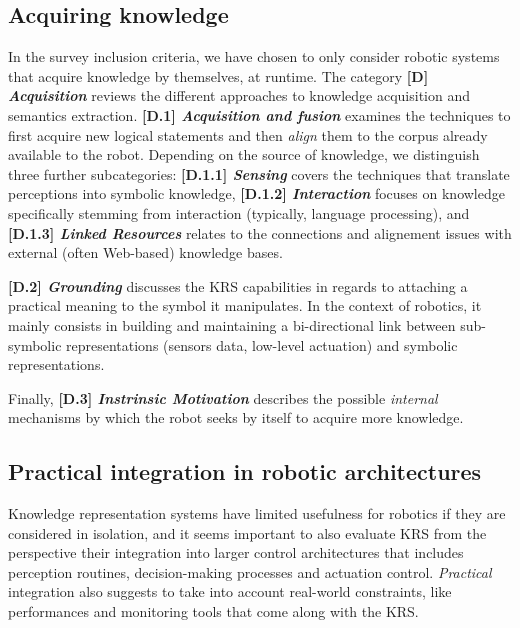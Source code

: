 \documentclass{IEEEtran}
\newcommand{\taxon}[2]{%
    \textbf{[#1] \emph{#2}}
}
\begin{document}
\subsection{Acquiring knowledge}

In the survey inclusion criteria, we have chosen to only consider robotic
systems that acquire knowledge by themselves, at runtime. The category
\taxon{D}{Acquisition} reviews the different approaches to knowledge acquisition
and semantics extraction. \taxon{D.1}{Acquisition and fusion} examines the
techniques to first acquire new logical statements and then \emph{align} them to
the corpus already available to the robot. Depending on the source of knowledge,
we distinguish three further subcategories: \taxon{D.1.1}{Sensing} covers the
techniques that translate perceptions into symbolic knowledge,
\taxon{D.1.2}{Interaction} focuses on knowledge specifically stemming from
interaction (typically, language processing), and \taxon{D.1.3}{Linked
Resources} relates to the connections and alignement issues with external
(often Web-based) knowledge bases.

\taxon{D.2}{Grounding} discusses the KRS capabilities in regards to attaching a
practical meaning to the symbol it manipulates. In the context of robotics, it
mainly consists in building and maintaining a bi-directional link between
sub-symbolic representations (sensors data, low-level actuation) and symbolic
representations.

Finally, \taxon{D.3}{Instrinsic Motivation} describes the possible
\emph{internal} mechanisms by which the robot seeks by itself to acquire more
knowledge.


\subsection{Practical integration in robotic architectures}
\label{sect|integration-robot}

Knowledge representation systems have limited usefulness for robotics if they are
considered in isolation, and it seems important to also evaluate KRS from the
perspective their integration into larger control architectures that includes
perception routines, decision-making processes and actuation control.
\emph{Practical} integration also suggests to take into account real-world
constraints, like performances and monitoring tools that come along with the KRS.
\end{document}
